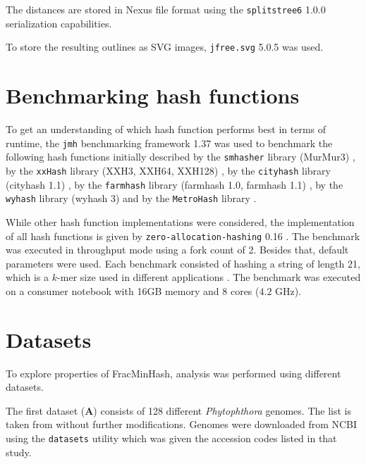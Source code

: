 The distances are stored in Nexus file format using the
\texttt{splitstree6} 1.0.0 \cite{husonApplicationPhylogeneticNetworks2006}
serialization capabilities.

To store the resulting outlines as SVG images, \texttt{jfree.svg} 5.0.5
\cite{gilbertJFreeSVG2023} was used.


\section{Benchmarking hash functions}
To get an understanding of which hash function performs best in terms of
runtime, the \texttt{jmh} benchmarking framework 1.37
\cite{theopenjdkcommunityJavaMicrobenchmarkHarness2023} was used to benchmark
the following hash functions initially described by the \texttt{smhasher}
library (MurMur3) \cite{applebyAapplebySmhasher}, by the \texttt{xxHash} library
(XXH3, XXH64, XXH128) \cite{colletXxHash2023}, by the \texttt{cityhash} library
(cityhash 1.1) \cite{pikeCityhash2011}, by the \texttt{farmhash} library
(farmhash 1.0, farmhash 1.1) \cite{pikeFarmhash2014}, by the \texttt{wyhash}
library (wyhash 3) \cite{wangWyhash2019} and by the \texttt{MetroHash} library
\cite{rogersMetroHash2018}.
 
While other hash function implementations were considered, the implementation of
all hash functions is given by \texttt{zero-allocation-hashing} 0.16
\cite{ZeroAllocationHashing2022}. The benchmark was executed in throughput mode
using a fork count of 2. Besides that, default parameters were used. Each
benchmark consisted of hashing a string of length 21, which is a $k$-mer size
used in different applications
\cite{ondovMashFastGenome2016,bagciMicrobialPhylogeneticContext2021}. The
benchmark was executed on a consumer notebook with 16GB memory and 8 cores
($4.2$ GHz).


\section{Datasets}
To explore properties of FracMinHash, analysis was performed using different
datasets. 

The first dataset (\textbf{A}) consists of 128 different \textit{Phytophthora}
genomes. The list is taken from \cite{mandalComparativeGenomeAnalysis2022}
without further modifications. Genomes were downloaded from NCBI using the
\texttt{datasets} utility \cite{sayersDatabaseResourcesNational2022} which was
given the accession codes listed in that study.

